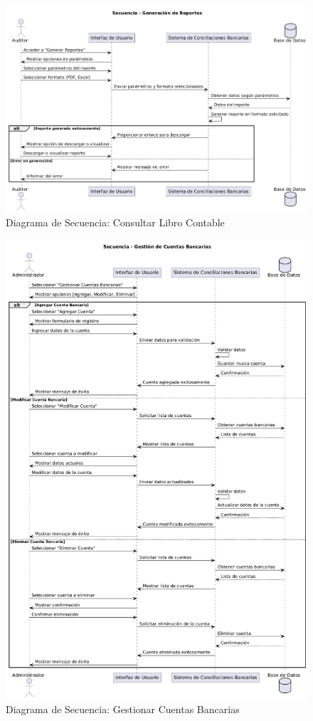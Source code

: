 \documentclass{article}
\begin{document}
\begin{figure}[H]
    \centering
    \includegraphics[width=\textwidth]{secuencia/GenerarReportes.png}
    \caption{Diagrama de Secuencia: Consultar Libro Contable}
\end{figure}

\begin{figure}[H]
    \centering
    \includegraphics[width=\textwidth]{secuencia/GestionCuentaBancaria.png}
    \caption{Diagrama de Secuencia: Gestionar Cuentas Bancarias}
\end{figure}
\end{document}
